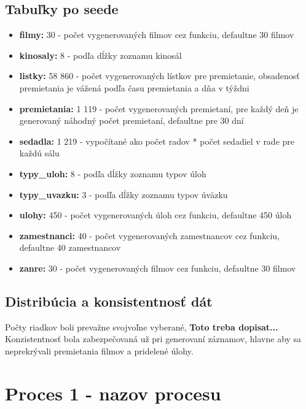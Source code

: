 \documentclass[11pt, a4paper]{article}
\begin{document}
\subsection{Tabuľky po seede}
\begin{itemize}
    \item \textbf{filmy:} 30 - počet vygenerovaných filmov cez funkciu, defaultne 30 filmov
    \item \textbf{kinosaly:} 8 - podľa dĺžky zoznamu kinosál
    \item \textbf{listky:} 58 860 - počet vygenerovaných lístkov pre premietanie, obsadenosť premietania je vážená podľa času premietania a dňa v týždni
    \item \textbf{premietania:} 1 119 - počet vygenerovaných premietaní, pre každý deň je generovaný náhodný počet premietaní, defaultne pre 30 dní
    \item \textbf{sedadla:} 1 219 - vypočítané ako počet radov * počet sedadiel v rade pre každú sálu
    \item \textbf{typy\_uloh:} 8 - podľa dĺžky zoznamu typov úloh
    \item \textbf{typy\_uvazku:} 3 - podľa dĺžky zoznamu typov úväzku
    \item \textbf{ulohy:} 450 - počet vygenerovaných úloh cez funkciu, defaultne 450 úloh
    \item \textbf{zamestnanci:} 40 - počet vygenerovaných zamestnancov cez funkciu, defaultne 40 zamestnancov
    \item \textbf{zanre:} 30 - počet vygenerovaných filmov cez funkciu, defaultne 30 filmov
\end{itemize}

\subsection{Distribúcia a konsistentnosť dát}
Počty riadkov boli prevažne svojvoľne vyberané, \textbf{Toto treba dopisat...}
Konzistentnosť bola zabezpečovaná už pri generovaní záznamov, hlavne aby sa neprekrývali premietania filmov a pridelené úlohy.

\subsection{}
\newpage

\section{Proces 1 - nazov procesu}
\label{sec:proces1}
\end{document}
